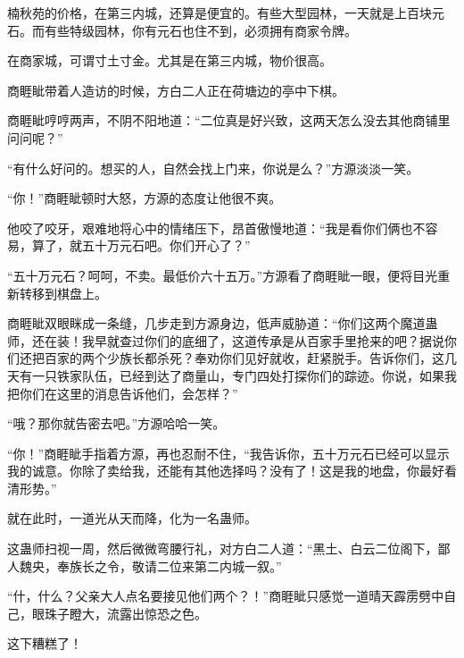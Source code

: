 \begin{this_body}
楠秋苑的价格，在第三内城，还算是便宜的。有些大型园林，一天就是上百块元石。而有些特级园林，你有元石也住不到，必须拥有商家令牌。

在商家城，可谓寸土寸金。尤其是在第三内城，物价很高。

商睚眦带着人造访的时候，方白二人正在荷塘边的亭中下棋。

商睚眦哼哼两声，不阴不阳地道：“二位真是好兴致，这两天怎么没去其他商铺里问问呢？”

“有什么好问的。想买的人，自然会找上门来，你说是么？”方源淡淡一笑。

“你！”商睚眦顿时大怒，方源的态度让他很不爽。

他咬了咬牙，艰难地将心中的情绪压下，昂首傲慢地道：“我是看你们俩也不容易，算了，就五十万元石吧。你们开心了？”

“五十万元石？呵呵，不卖。最低价六十五万。”方源看了商睚眦一眼，便将目光重新转移到棋盘上。

商睚眦双眼眯成一条缝，几步走到方源身边，低声威胁道：“你们这两个魔道蛊师，还在装！我早就查过你们的底细了，这道传承是从百家手里抢来的吧？据说你们还把百家的两个少族长都杀死？奉劝你们见好就收，赶紧脱手。告诉你们，这几天有一只铁家队伍，已经到达了商量山，专门四处打探你们的踪迹。你说，如果我把你们在这里的消息告诉他们，会怎样？”

“哦？那你就告密去吧。”方源哈哈一笑。

“你！”商睚眦手指着方源，再也忍耐不住，“我告诉你，五十万元石已经可以显示我的诚意。你除了卖给我，还能有其他选择吗？没有了！这是我的地盘，你最好看清形势。”

就在此时，一道光从天而降，化为一名蛊师。

这蛊师扫视一周，然后微微弯腰行礼，对方白二人道：“黑土、白云二位阁下，鄙人魏央，奉族长之令，敬请二位来第二内城一叙。”

“什，什么？父亲大人点名要接见他们两个？！”商睚眦只感觉一道晴天霹雳劈中自己，眼珠子瞪大，流露出惊恐之色。

这下糟糕了！

\end{this_body}

